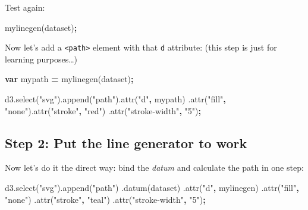 \documentclass[openany]{book}
\newenvironment{Shaded}{\begin{snugshade}}{\end{snugshade}}
\newcommand{\AttributeTok}[1]{\textcolor[rgb]{0.77,0.63,0.00}{#1}}
\newcommand{\KeywordTok}[1]{\textcolor[rgb]{0.13,0.29,0.53}{\textbf{#1}}}
\newcommand{\NormalTok}[1]{#1}
\newcommand{\OperatorTok}[1]{\textcolor[rgb]{0.81,0.36,0.00}{\textbf{#1}}}
\newcommand{\StringTok}[1]{\textcolor[rgb]{0.31,0.60,0.02}{#1}}
\newcommand{\VariableTok}[1]{\textcolor[rgb]{0.00,0.00,0.00}{#1}}
\begin{document}
Test again:

\begin{Shaded}
\begin{Highlighting}[]
\AttributeTok{mylinegen}\NormalTok{(dataset)}\OperatorTok{;}
\end{Highlighting}
\end{Shaded}

Now let's add a \texttt{\textless{}path\textgreater{}} element with that \texttt{d} attribute: (this step is just for learning purposes\ldots{})

\begin{Shaded}
\begin{Highlighting}[]
\KeywordTok{var}\NormalTok{ mypath }\OperatorTok{=} \AttributeTok{mylinegen}\NormalTok{(dataset)}\OperatorTok{;}

\VariableTok{d3}\NormalTok{.}\AttributeTok{select}\NormalTok{(}\StringTok{"svg"}\NormalTok{).}\AttributeTok{append}\NormalTok{(}\StringTok{"path"}\NormalTok{).}\AttributeTok{attr}\NormalTok{(}\StringTok{"d"}\OperatorTok{,}\NormalTok{ mypath)}
\NormalTok{    .}\AttributeTok{attr}\NormalTok{(}\StringTok{"fill"}\OperatorTok{,} \StringTok{"none"}\NormalTok{).}\AttributeTok{attr}\NormalTok{(}\StringTok{"stroke"}\OperatorTok{,} \StringTok{"red"}\NormalTok{)}
\NormalTok{    .}\AttributeTok{attr}\NormalTok{(}\StringTok{"stroke-width"}\OperatorTok{,} \StringTok{"5"}\NormalTok{)}\OperatorTok{;}
\end{Highlighting}
\end{Shaded}

\hypertarget{step-2-put-the-line-generator-to-work}{%
\subsection{Step 2: Put the line generator to work}\label{step-2-put-the-line-generator-to-work}}

Now let's do it the direct way: bind the \emph{datum} and calculate the path in one step:

\begin{Shaded}
\begin{Highlighting}[]
\VariableTok{d3}\NormalTok{.}\AttributeTok{select}\NormalTok{(}\StringTok{"svg"}\NormalTok{).}\AttributeTok{append}\NormalTok{(}\StringTok{"path"}\NormalTok{)}
\NormalTok{    .}\AttributeTok{datum}\NormalTok{(dataset)}
\NormalTok{    .}\AttributeTok{attr}\NormalTok{(}\StringTok{"d"}\OperatorTok{,}\NormalTok{ mylinegen)}
\NormalTok{    .}\AttributeTok{attr}\NormalTok{(}\StringTok{"fill"}\OperatorTok{,} \StringTok{"none"}\NormalTok{)}
\NormalTok{    .}\AttributeTok{attr}\NormalTok{(}\StringTok{"stroke"}\OperatorTok{,} \StringTok{"teal"}\NormalTok{)}
\NormalTok{    .}\AttributeTok{attr}\NormalTok{(}\StringTok{"stroke-width"}\OperatorTok{,} \StringTok{"5"}\NormalTok{)}\OperatorTok{;}
\end{Highlighting}
\end{Shaded}
\end{document}
